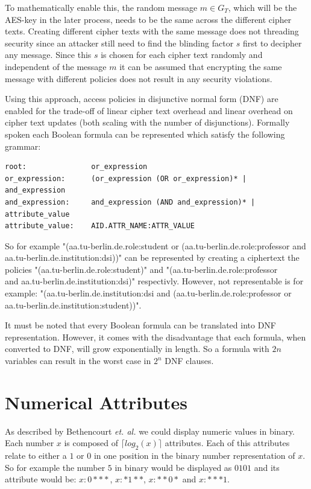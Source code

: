 To mathematically enable this, the random message $m \in G_T$, which will be the AES-key in the later process, needs to be the same across the different cipher texts. Creating different cipher texts with the same message does not threading security since an attacker still need to find the blinding factor $s$ first to decipher any message. Since this $s$ is chosen for each cipher text randomly and independent of the message $m$ it can be assumed that encrypting the same message with different policies does not result in any security violations. 

Using this approach, access policies in disjunctive normal form (DNF) are enabled for the trade-off of linear cipher text overhead and linear overhead on cipher text updates (both scaling with the number of disjunctions). Formally spoken each Boolean formula can be represented which satisfy the following grammar:

\begin{center}
\begin{lstlisting}[caption={Phseudo gramma for creating a DNF formula},captionpos=b]
root:               or_expression
or_expression:      (or_expression (OR or_expression)* | and_expression
and_expression:     and_expression (AND and_expression)* | attribute_value
attribute_value:    AID.ATTR_NAME:ATTR_VALUE
\end{lstlisting}
\end{center}

So for example "(aa.tu-berlin.de.role:student or (aa.tu-berlin.de.role:professor and aa.tu-berlin.de.institution:dsi))" can be represented by creating a ciphertext the policies "(aa.tu-berlin.de.role:student)" and "(aa.tu-berlin.de.role:professor\\ and aa.tu-berlin.de.institution:dsi)" respectivly. However, not representable is for example: "(aa.tu-berlin.de.institution:dsi and (aa.tu-berlin.de.role:professor or aa.tu-berlin.de.institution:student))".

It must be noted that every Boolean formula can be translated into DNF representation. However, it comes with the disadvantage that each formula, when converted to DNF, will grow exponentially in length. So a formula with $2n$ variables can result in the worst case in $2^n$ DNF clauses. 

\section{Numerical Attributes}
As described by Bethencourt \textit{et. al.} \cite{bethencourt2007ciphertext} we could display numeric values in binary. Each number $x$ is composed of $\lceil log_2(x) \rceil$ attributes. Each of this attributes relate to either a $1$ or $0$ in one position in the binary number representation of $x$. So for example the number $5$ in binary would be displayed as $0101$ and its attribute would be: $x:0***$, $x:*1**$, $x:**0*$ and $x:***1$. 

